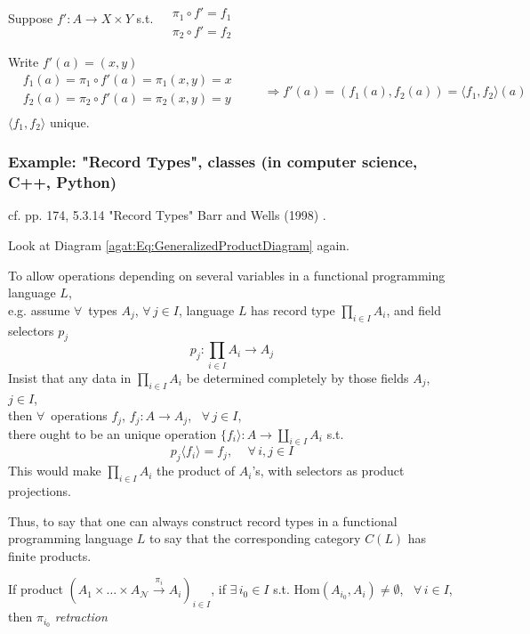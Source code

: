 Suppose $f': A \to X\times Y$ s.t. $\begin{aligned} & \quad \\
& \pi_1 \circ f' = f_1 \\
& \pi_2 \circ f' = f_2 \end{aligned}$

Write $f'(a) = (x,y)$
\[
\begin{aligned}
& f_1(a) = \pi_1 \circ f'(a) = \pi_1(x,y) =x \\ 
& f_2(a) = \pi_2 \circ f'(a) = \pi_2(x,y) =y \\ 
\end{aligned} \qquad \, \Longrightarrow f'(a) = (f_1(a), f_2(a)) = \langle f_1, f_2 \rangle (a)
\]
$\langle f_1, f_2 \rangle $ unique.  

\subsubsection{Example: "Record Types", classes (in computer science, C++, Python)}\label{agat:SubSubSec:RecordTypesProduct}

cf. pp. 174, 5.3.14 "Record Types" Barr and Wells (1998) \cite{agat:BW1998}.

Look at Diagram \ref{agat:Eq:GeneralizedProductDiagram} again.

To allow operations depending on several variables in a functional programming language $L$, \\
e.g. assume $\forall \,$ types $A_j$, $\forall \, j \in I$, language $L$ has record type $\prod_{i\in I} A_i$, and field selectors $p_j$
\[
p_j : \prod_{i\in I} A_i \to A_j
\]
Insist that any data in $\prod_{i\in I} A_i$ be determined completely by those fields $A_j$, $j\in I$, \\
then $\forall \, $ operations $f_j$, $f_j : A \to A_j$, \, $\forall \, j \in I$, \\
there ought to be an unique operation $\lbrace f_i \rangle : A \to \coprod_{i\in I} A_i$ s.t. 
\[
p_j\langle f_i \rangle = f_j, \quad \, \forall \, i, j \in I
\]
This would make $\prod_{i\in I} A_i$ the product of $A_i$'s, with selectors as product projections.

Thus, to say that one can always construct record types in a functional programming language $L$ to say that the corresponding category $C(L)$ has finite products. 


\begin{proposition}
	If product $(A_1 \times \dots \times A_{\mathcal{N}} \xrightarrow{ \pi_i } A_i )_{i\in I}$, if $\exists \,  i_0 \in I$ s.t. $\text{Hom}(A_{i_0}, A_i) \neq \emptyset$, \, $\forall \, i \in I$, \\
	then $\pi_{i_0}$ \emph{retraction }
\end{proposition}

